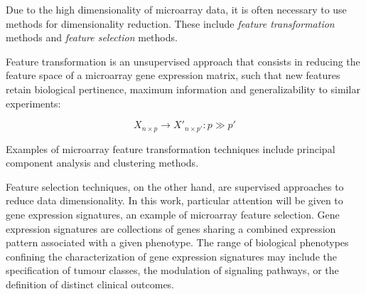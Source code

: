 Due to the high dimensionality of microarray data, it is often necessary to use
methods for dimensionality reduction.  These include \emph{feature
  transformation} methods and \emph{feature selection}
methods.\cite{haibe-kains_identification_2009}

Feature transformation is an unsupervised approach that consists in reducing the
feature space of a microarray gene expression matrix, such that new features
retain biological pertinence, maximum information and generalizability to
similar experiments:

\begin{equation}
  \label{eq:feature-transformation}
  X_{n \times p} \to X'_{n \times p'} : p \gg p'
\end{equation}

Examples of microarray feature transformation techniques include principal
component analysis and clustering methods.

Feature selection techniques, on the other hand, are supervised approaches to
reduce data dimensionality.  In this work, particular attention will be given to
gene expression signatures, an example of microarray feature selection.  Gene
expression signatures are collections of genes sharing a combined expression
pattern associated with a given phenotype.  The range of biological phenotypes
confining the characterization of gene expression signatures may include the
specification of tumour classes,\cite{perou_molecular_2000} the modulation of
signaling pathways,\cite{itadani_can_2008} or the definition of distinct
clinical outcomes.\cite{vant_veer_gene_2002}





